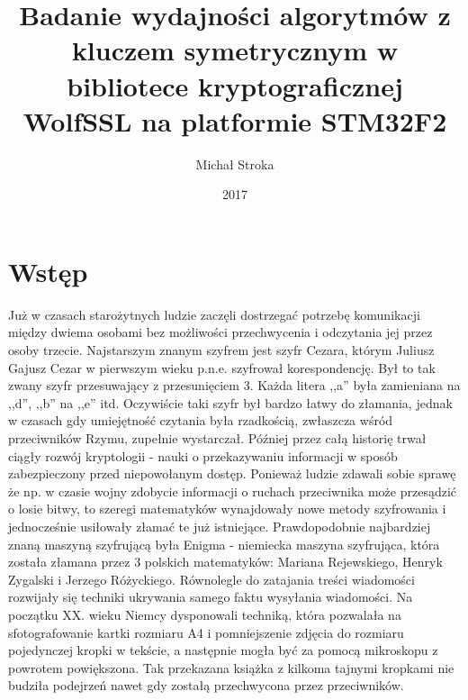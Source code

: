 \documentclass[oneside]{mgr}
\title{Badanie wydajności algorytmów z kluczem symetrycznym w bibliotece kryptograficznej WolfSSL na platformie STM32F2}
\author{Michał Stroka}
\date{2017} %
\begin{document}

\maketitle

\tableofcontents %

\chapter{Wstęp}
Już w czasach starożytnych ludzie zaczęli dostrzegać potrzebę komunikacji między dwiema osobami bez możliwości przechwycenia i odczytania jej przez osoby trzecie. Najstarszym znanym szyfrem jest szyfr Cezara, którym Juliusz Gajusz Cezar w pierwszym wieku p.n.e. szyfrował korespondencję. Był to tak zwany szyfr przesuwający z przesunięciem 3. Każda litera ,,a'' była zamieniana na ,,d'', ,,b'' na ,,e'' itd. Oczywiście taki szyfr był bardzo łatwy do złamania, jednak w czasach gdy umiejętność czytania była rzadkością, zwłaszcza wśród przeciwników Rzymu, zupełnie wystarczał. Później przez całą historię trwał ciągły rozwój kryptologii - nauki o przekazywaniu informacji w sposób zabezpieczony przed niepowołanym dostęp. Ponieważ ludzie zdawali sobie sprawę że np. w czasie wojny zdobycie informacji o ruchach przeciwnika może przesądzić o losie bitwy, to szeregi matematyków wynajdowały nowe metody szyfrowania i jednocześnie usiłowały złamać te już istniejące. Prawdopodobnie najbardziej znaną maszyną szyfrującą była Enigma - niemiecka maszyna szyfrująca, która została złamana przez 3 polskich matematyków: Mariana Rejewskiego, Henryk Zygalski i Jerzego Różyckiego. Równolegle do zatajania treści wiadomości rozwijały się techniki ukrywania samego faktu wysyłania wiadomości. Na początku XX. wieku Niemcy dysponowali techniką, która pozwalała na sfotografowanie kartki rozmiaru A4 i pomniejszenie zdjęcia do rozmiaru pojedynczej kropki w tekście, a następnie mogła być za pomocą mikroskopu z powrotem powiększona. Tak przekazana książka z kilkoma tajnymi kropkami nie budziła podejrzeń nawet gdy zostałą przechwycona przez przeciwników.\\
\end{document}
